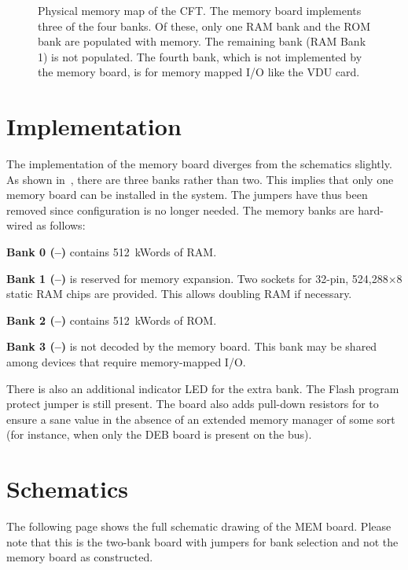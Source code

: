 \begin{figure}[tb]
  \centering
  \caption[Physical memory map of the
    CFT]{\label{fig:mem-physmap}Physical memory map of the CFT. The
    memory board implements three of the four banks. Of these, only
    one RAM bank and the ROM bank are populated with memory. The
    remaining bank (RAM Bank 1) is not populated. The fourth bank,
    which is not implemented by the memory board, is for memory mapped
    I/O like the VDU card.}
\end{figure}


\section{Implementation}

The implementation of the memory board diverges from the schematics
slightly. As shown in~, there are three banks
rather than two. This implies that only one memory board can be
installed in the system. The jumpers have thus been removed since
configuration is no longer needed. The memory banks are hard-wired as
follows:

\begin{description}
  \item{\bfseries Bank 0 (–)} contains
    512~kWords of RAM.
  \item{\bfseries Bank 1 (–)} is reserved for
    memory expansion. Two sockets for 32-pin, 524,288×8 static RAM
    chips are provided. This allows doubling RAM if necessary.
  \item{\bfseries Bank 2 (–)} contains
    512~kWords of ROM.
  \item{\bfseries Bank 3 (–)} is not decoded
    by the memory board. This bank may be shared among devices that
    require memory-mapped I/O.
\end{description}

There is also an additional indicator LED for the extra bank. The
Flash program protect jumper is still present. The board also adds
pull-down resistors for  to ensure a sane value in the
absence of an extended memory manager of some sort (for instance, when
only the \gls{DEB} board is present on the bus).

\section{Schematics}

The following page shows the full schematic drawing of the \gls{MEM}
board. Please note that this is the two-bank board with jumpers for
bank selection and not the memory board as constructed.

\cleardoublepage
{}
